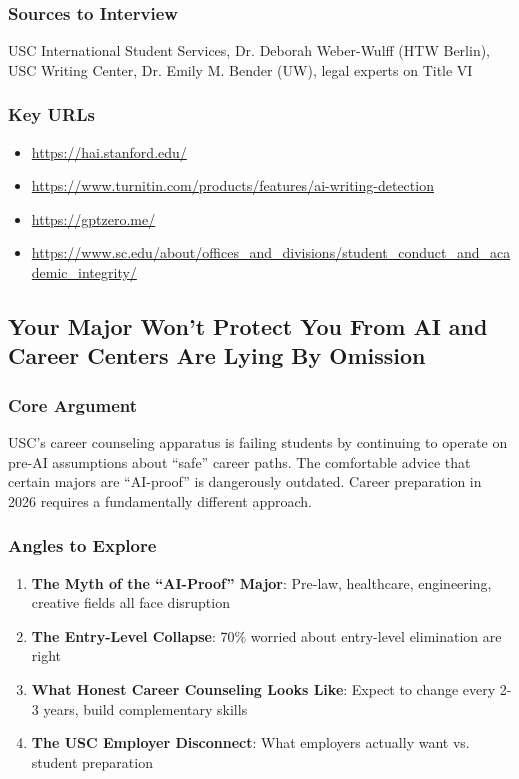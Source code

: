 \documentclass[11pt,letterpaper]{article}
\begin{document}
\subsubsection*{Sources to Interview}
USC International Student Services, Dr. Deborah Weber-Wulff (HTW Berlin), USC Writing Center, Dr. Emily M. Bender (UW), legal experts on Title VI

\subsubsection*{Key URLs}
\begin{itemize}[noitemsep]
    \item \url{https://hai.stanford.edu/}
    \item \url{https://www.turnitin.com/products/features/ai-writing-detection}
    \item \url{https://gptzero.me/}
    \item \url{https://www.sc.edu/about/offices_and_divisions/student_conduct_and_academic_integrity/}
\end{itemize}

\newpage
\subsection{Your Major Won't Protect You From AI and Career Centers Are Lying By Omission}

\subsubsection*{Core Argument}
USC's career counseling apparatus is failing students by continuing to operate on pre-AI assumptions about ``safe'' career paths. The comfortable advice that certain majors are ``AI-proof'' is dangerously outdated. Career preparation in 2026 requires a fundamentally different approach.

\subsubsection*{Angles to Explore}
\begin{enumerate}[noitemsep]
    \item \textbf{The Myth of the ``AI-Proof'' Major}: Pre-law, healthcare, engineering, creative fields all face disruption
    \item \textbf{The Entry-Level Collapse}: 70\% worried about entry-level elimination are right
    \item \textbf{What Honest Career Counseling Looks Like}: Expect to change every 2-3 years, build complementary skills
    \item \textbf{The USC Employer Disconnect}: What employers actually want vs. student preparation
\end{enumerate}
\end{document}
